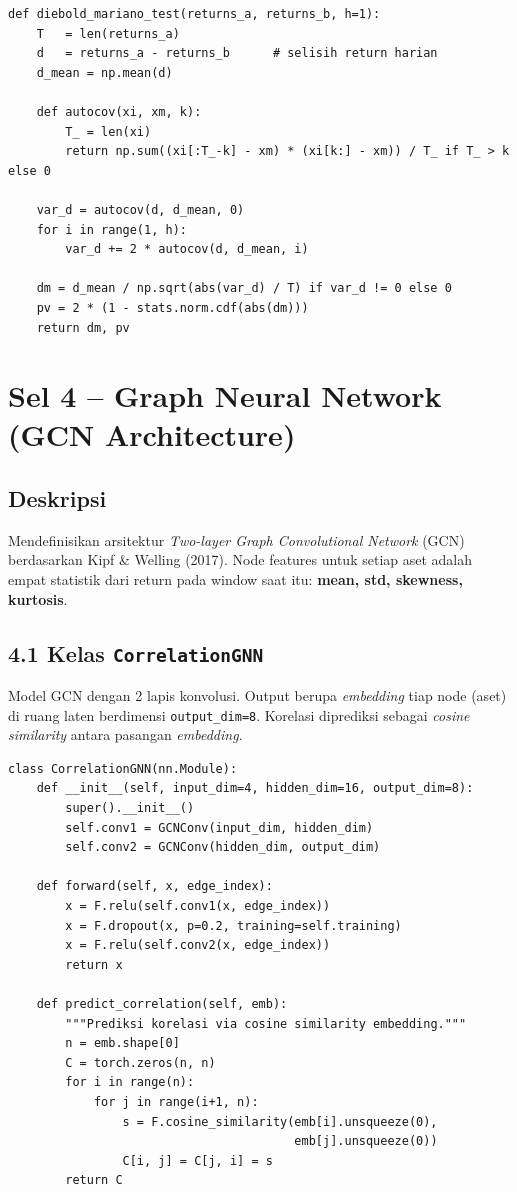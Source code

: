 \documentclass[12pt,a4paper]{article}
\begin{document}
\begin{lstlisting}[caption={\texttt{diebold\_mariano\_test}}]
def diebold_mariano_test(returns_a, returns_b, h=1):
    T   = len(returns_a)
    d   = returns_a - returns_b      # selisih return harian
    d_mean = np.mean(d)

    def autocov(xi, xm, k):
        T_ = len(xi)
        return np.sum((xi[:T_-k] - xm) * (xi[k:] - xm)) / T_ if T_ > k else 0

    var_d = autocov(d, d_mean, 0)
    for i in range(1, h):
        var_d += 2 * autocov(d, d_mean, i)

    dm = d_mean / np.sqrt(abs(var_d) / T) if var_d != 0 else 0
    pv = 2 * (1 - stats.norm.cdf(abs(dm)))
    return dm, pv
\end{lstlisting}

\section{Sel 4 -- Graph Neural Network (GCN Architecture)}

\subsection{Deskripsi}
Mendefinisikan arsitektur \textit{Two-layer Graph Convolutional Network} (GCN)
berdasarkan Kipf \& Welling (2017). Node features untuk setiap aset adalah
empat statistik dari return pada window saat itu:
\textbf{mean, std, skewness, kurtosis}.

\subsection{4.1 Kelas \texttt{CorrelationGNN}}
Model GCN dengan 2 lapis konvolusi. Output berupa \textit{embedding} tiap node
(aset) di ruang laten berdimensi \texttt{output\_dim=8}. Korelasi diprediksi
sebagai \textit{cosine similarity} antara pasangan \textit{embedding}.

\begin{lstlisting}[caption={Arsitektur CorrelationGNN}]
class CorrelationGNN(nn.Module):
    def __init__(self, input_dim=4, hidden_dim=16, output_dim=8):
        super().__init__()
        self.conv1 = GCNConv(input_dim, hidden_dim)
        self.conv2 = GCNConv(hidden_dim, output_dim)

    def forward(self, x, edge_index):
        x = F.relu(self.conv1(x, edge_index))
        x = F.dropout(x, p=0.2, training=self.training)
        x = F.relu(self.conv2(x, edge_index))
        return x

    def predict_correlation(self, emb):
        """Prediksi korelasi via cosine similarity embedding."""
        n = emb.shape[0]
        C = torch.zeros(n, n)
        for i in range(n):
            for j in range(i+1, n):
                s = F.cosine_similarity(emb[i].unsqueeze(0),
                                        emb[j].unsqueeze(0))
                C[i, j] = C[j, i] = s
        return C
\end{lstlisting}
\end{document}
